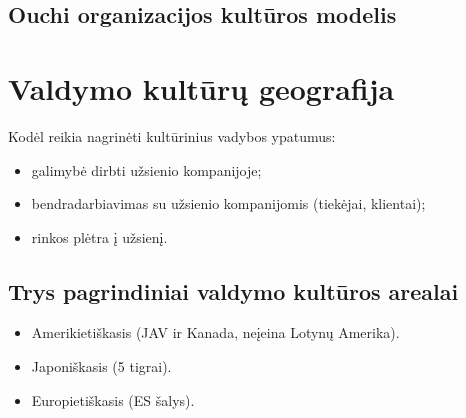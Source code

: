 \section{Ouchi organizacijos kultūros modelis}


\chapter{Valdymo kultūrų geografija}

Kodėl reikia nagrinėti kultūrinius vadybos ypatumus:
\begin{itemize}
  \item galimybė dirbti užsienio kompanijoje;
  \item bendradarbiavimas su užsienio kompanijomis (tiekėjai, klientai);
  \item rinkos plėtra į užsienį.
\end{itemize}

\section{Trys pagrindiniai valdymo kultūros arealai}

\begin{itemize}
  \item Amerikietiškasis (JAV ir Kanada, neįeina Lotynų Amerika).
  \item Japoniškasis (5 tigrai).
  \item Europietiškasis (ES šalys).
\end{itemize}

